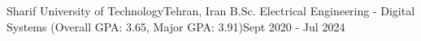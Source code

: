 \resumeSubheading
{Sharif University of Technology}{Tehran, Iran}
{B.Sc. Electrical Engineering \-- Digital Systems (Overall GPA: 3.65, Major GPA: 3.91)}{Sept 2020 \-- Jul 2024}